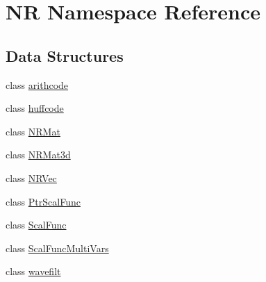 \hypertarget{namespaceNR}{}\section{NR Namespace Reference}
\label{namespaceNR}
\subsection*{Data Structures}
\begin{DoxyCompactItemize}
\item 
class \mbox{\hyperlink{classNR_1_1arithcode}{arithcode}}
\item 
class \mbox{\hyperlink{classNR_1_1huffcode}{huffcode}}
\item 
class \mbox{\hyperlink{classNR_1_1NRMat}{N\+R\+Mat}}
\item 
class \mbox{\hyperlink{classNR_1_1NRMat3d}{N\+R\+Mat3d}}
\item 
class \mbox{\hyperlink{classNR_1_1NRVec}{N\+R\+Vec}}
\item 
class \mbox{\hyperlink{classNR_1_1PtrScalFunc}{Ptr\+Scal\+Func}}
\item 
class \mbox{\hyperlink{classNR_1_1ScalFunc}{Scal\+Func}}
\item 
class \mbox{\hyperlink{classNR_1_1ScalFuncMultiVars}{Scal\+Func\+Multi\+Vars}}
\item 
class \mbox{\hyperlink{classNR_1_1wavefilt}{wavefilt}}
\end{DoxyCompactItemize}
